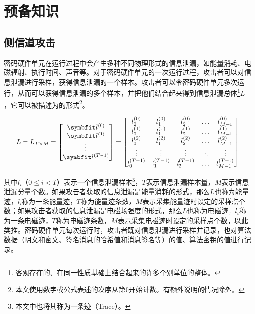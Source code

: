 
\usetikzlibrary{graphs, positioning, quotes, shapes.geometric}
\chapter{预备知识}\label{chap:preliminary}{
	\section{侧信道攻击}
	密码硬件单元在运行过程中会产生多种不同物理形式的信息泄漏，如能量消耗、电磁辐射、执行时间、声音等。对于密码硬件单元的一次运行过程，攻击者可以对信息泄漏进行采样，获得信息泄漏的一个样本。攻击者可以令密码硬件单元多次运行，从而可以获得信息泄漏的多个样本，并把他们结合起来得到信息泄漏总体\footnote{客观存在的、在同一性质基础上结合起来的许多个别单位的整体。}$L$，它可以被描述为的形式\footnote{本文使用数字或公式表述的次序从第0开始计数。有额外说明的情况除外。}。
	
	\begin{equation}
	L=L_{T\times M}
	=\begin{bmatrix}
		\Vector {l^{(0)}}\\
		\Vector {l^{(1)}}\\
		\vdots\\
		\Vector {l^{(T-1)}}
	\end{bmatrix}
	=\begin{bmatrix}
		l^{(0)}_0&l^{(0)}_1&l^{(0)}_2&\ldots&l^{(0)}_{M-1}\\
		l^{(1)}_0&l^{(1)}_1&l^{(1)}_2&\ldots&l^{(1)}_{M-1}\\
		l^{(2)}_0&l^{(2)}_1&l^{(2)}_2&\ldots&l^{(2)}_{M-1}\\
		\vdots&\vdots&\vdots&\ddots&\vdots\\
		l^{(T-1)}_0&l^{(T-1)}_1&l^{(T-1)}_2&\ldots&l^{(T-1)}_{M-1}\\
	\end{bmatrix}\label{eq:trace}
	\end{equation}
	
	\noindent 其中$l_i$（$0\le i<T$）表示一个信息泄漏样本\footnote{本文中也将其称为一条迹（Trace）。}，$T$表示信息泄漏样本量，$M$表示信息泄漏分量个数。如果攻击者获取的信息泄漏是能量消耗的形式，那么$L$也称为能量迹，$l_i$称为一条能量迹，$T$称为能量迹条数，$M$表示采集能量迹时设定的采样点个数；如果攻击者获取的信息泄漏是电磁场强度的形式，那么$L$也称为电磁迹，$l_i$称为一条电磁迹，$T$称为电磁迹条数，$M$表示采集电磁迹时设定的采样点个数，以此类推。密码硬件单元每次运行时，攻击者既对信息泄漏进行采样并记录，也对算法数据（明文和密文、签名消息的哈希值和消息签名等）的值、算法密钥的值进行记录。%
	
}
